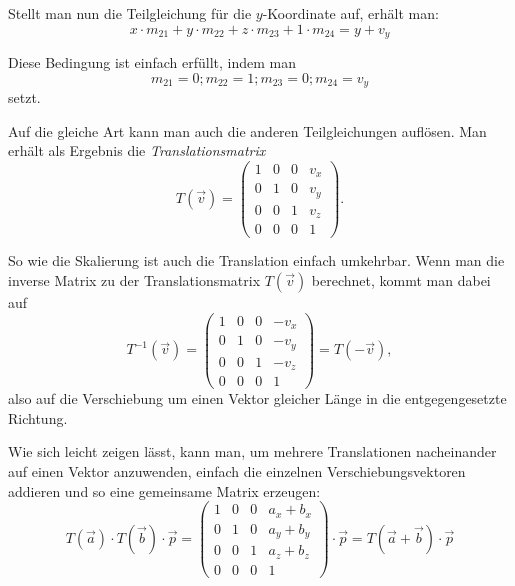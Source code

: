 Stellt man nun die Teilgleichung für die $y$-Koordinate auf, erhält man:
\begin{equation}
 x \cdot m_{21} + y \cdot m_{22} + z \cdot m_{23} + 1 \cdot m_{24} = y + v_y
\end{equation}

Diese Bedingung ist einfach erfüllt, indem man
\begin{equation}
 m_{21} = 0; m_{22} = 1; m_{23} = 0; m_{24} = v_y
\end{equation}
setzt.

Auf die gleiche Art kann man auch die anderen Teilgleichungen auflösen. Man erhält als Ergebnis die \emph{Translationsmatrix}
\begin{equation}
 T{(\vec v)} =
 \begin{pmatrix}
  1 & 0 & 0 & v_x \\
  0 & 1 & 0 & v_y \\
  0 & 0 & 1 & v_z \\
  0 & 0 & 0 & 1
 \end{pmatrix}.
\end{equation}

So wie die Skalierung ist auch die Translation einfach umkehrbar. Wenn man die inverse Matrix zu der Translationsmatrix $T{(\vec v)}$ berechnet, kommt man dabei auf
\begin{equation}
 T^{-1}{(\vec v)} =
 \begin{pmatrix}
  1 & 0 & 0 & -v_x \\
  0 & 1 & 0 & -v_y \\
  0 & 0 & 1 & -v_z \\
  0 & 0 & 0 & 1
 \end{pmatrix} = T{(-\vec v)},
\end{equation}
also auf die Verschiebung um einen Vektor gleicher Länge in die entgegengesetzte Richtung.

Wie sich leicht zeigen lässt, kann man, um mehrere Translationen nacheinander auf einen Vektor anzuwenden, einfach die einzelnen Verschiebungsvektoren addieren und so eine gemeinsame Matrix erzeugen:
\begin{equation}
 \label{translationaddition}
 T{(\vec a)} \cdot T{(\vec b)} \cdot \vec p = 
 \begin{pmatrix}
  1 & 0 & 0 & a_x + b_x \\
  0 & 1 & 0 & a_y + b_y \\
  0 & 0 & 1 & a_z + b_z \\
  0 & 0 & 0 & 1
 \end{pmatrix} \cdot \vec p = T{(\vec a + \vec b)} \cdot \vec p
\end{equation}

